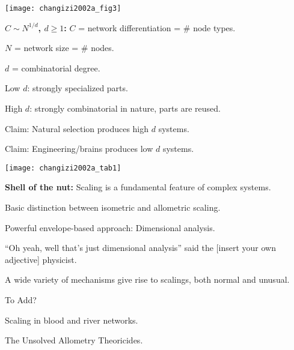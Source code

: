 \begin{marginfigure}[]
  \texttt{[image: changizi2002a\_fig3]}
\end{marginfigure}

\textbf{$C \sim N^{1/d}$, $d \ge 1$:}
$C$ = network differentiation = \# node types.

$N$ = network size = \# nodes.

$d$ = combinatorial degree.

Low $d$: strongly specialized parts.

High $d$: strongly combinatorial in nature, parts are reused. 

Claim: Natural selection produces high $d$ systems.

Claim: Engineering/brains produces low $d$ systems.



\begin{marginfigure}[]
  \texttt{[image: changizi2002a\_tab1]}
\end{marginfigure}

\textbf{Shell of the nut:}
Scaling is a fundamental feature of complex systems.

Basic distinction between isometric and allometric scaling.

Powerful envelope-based approach: Dimensional analysis.

``Oh yeah, well that's just dimensional analysis'' said the [insert
  your own adjective] physicist.

A wide variety of mechanisms give rise to scalings, 
both normal and unusual.




To Add?

Scaling in blood and river networks.

The Unsolved Allometry Theoricides.
